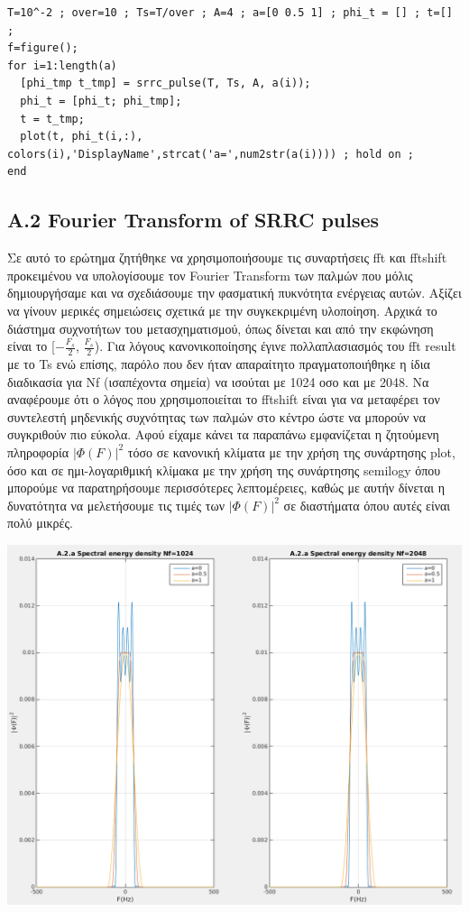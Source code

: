 \documentclass[11pt]{article}
\begin{document}
\begin{lstlisting}[caption = {Α.1}]
T=10^-2 ; over=10 ; Ts=T/over ; A=4 ; a=[0 0.5 1] ; phi_t = [] ; t=[] ; 
f=figure();
for i=1:length(a)
  [phi_tmp t_tmp] = srrc_pulse(T, Ts, A, a(i));
  phi_t = [phi_t; phi_tmp];
  t = t_tmp;
  plot(t, phi_t(i,:), colors(i),'DisplayName',strcat('a=',num2str(a(i)))) ; hold on ; 
end
\end{lstlisting}
    
    \subsection*{Α.2 Fourier Transform of SRRC pulses}
    Σε αυτό το ερώτημα ζητήθηκε να χρησιμοποιήσουμε τις συναρτήσεις fft και fftshift προκειμένου να υπολογίσουμε τον Fourier Transform των παλμών που μόλις δημιουργήσαμε και να σχεδιάσουμε την φασματική πυκνότητα ενέργειας αυτών. Αξίζει να γίνουν μερικές σημειώσεις σχετικά με την συγκεκριμένη υλοποίηση. Αρχικά το διάστημα συχνοτήτων του μετασχηματισμού, όπως δίνεται και από την εκφώνηση είναι το [−$\frac{F_s}{2}$, $\frac{F_s}{2}$). Για λόγους κανονικοποίησης έγινε πολλαπλασιασμός του fft result με το Ts ενώ επίσης, παρόλο που δεν ήταν απαραίτητο πραγματοποιήθηκε η ίδια διαδικασία για Νf (ισαπέχοντα σημεία) να ισούται με 1024 οσο και με 2048. Να αναφέρουμε ότι ο λόγος που χρησιμοποιείται το fftshift είναι για να μεταφέρει τον συντελεστή μηδενικής συχνότητας των παλμών στο κέντρο ώστε να μπορούν να συγκριθούν πιο εύκολα. Αφού είχαμε κάνει τα παραπάνω εμφανίζεται η ζητούμενη πληροφορία $|Φ(F)|^2$ τόσο σε κανονική κλίματα με την χρήση της συνάρτησης plot, όσο και σε ημι-λογαριθμική κλίμακα με την χρήση της συνάρτησης semilogy όπου μπορούμε να παρατηρήσουμε περισσότερες λεπτομέρειες, καθώς με αυτήν δίνεται η δυνατότητα να μελετήσουμε τις τιμές των $|Φ(F)|^2$ σε διαστήματα όπου αυτές είναι πολύ μικρές.
    
    
    \begin{center}
        \includegraphics[scale=0.36]{photos/A.2 Fourier Transform phi(F)-Plots_screenshot.png}
    \end{center} 
    
\end{document}
